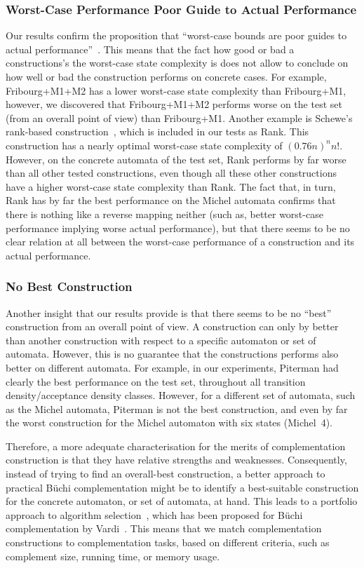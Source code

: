 \subsubsection{Worst-Case Performance Poor Guide to Actual Performance}
Our results confirm the proposition that ``worst-case bounds are poor guides to actual performance''~\cite{2011_tsai}. This means that the fact how good or bad a constructions's the worst-case state complexity is does not allow to conclude on how well or bad the construction performs on concrete cases. For example, Fribourg+M1+M2 has a lower worst-case state complexity than Fribourg+M1, however, we discovered that Fribourg+M1+M2 performs worse on the \goal{} test set (from an overall point of view) than Fribourg+M1. Another example is Schewe's rank-based construction~\cite{schewe2009buchi}, which is included in our tests as Rank. This construction has a nearly optimal worst-case state complexity of $(0.76n)^nn!$. However, on the concrete automata of the \goal{} test set, Rank performs by far worse than all other tested constructions, even though all these other constructions have a higher worst-case state complexity than Rank. The fact that, in turn, Rank has by far the best performance on the Michel automata confirms that there is nothing like a reverse mapping neither (such as, better worst-case performance implying worse actual performance), but that there seems to be no clear relation at all between the worst-case performance of a construction and its actual performance.

\subsubsection{No Best Construction}
Another insight that our results provide is that there seems to be no ``best'' construction from an overall point of view. A construction can only by better than another construction with respect to a specific automaton or set of automata. However, this is no guarantee that the constructions performs also better on different automata. For example, in our experiments, Piterman had clearly the best performance on the \goal{} test set, throughout all transition density/acceptance density classes. However, for a different set of automata, such as the Michel automata, Piterman is not the best construction, and even by far the worst construction for the Michel automaton with six states (Michel~4).

Therefore, a more adequate characterisation for the merits of complementation construction is that they have relative strengths and weaknesses. Consequently, instead of trying to find an overall-best construction, a better approach to practical Büchi complementation might be to identify a best-suitable construction for the concrete automaton, or set of automata, at hand. This leads to a portfolio approach to algorithm selection~\cite{leyton2003portfolio}, which has been proposed for Büchi complementation by Vardi~\cite{2007_vardi_model_checking}. This means that we match complementation constructions to complementation tasks, based on different criteria, such as complement size, running time, or memory usage.

